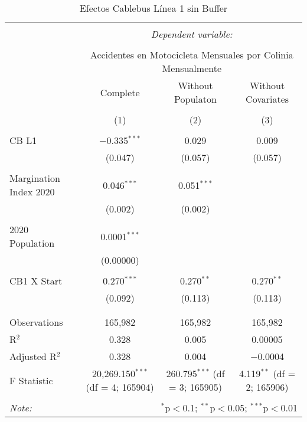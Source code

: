 
\begin{table}[!htbp] \centering 
  \caption{Efectos Cablebus Línea 1 sin Buffer} 
  \label{} 
\begin{tabular}{@{\extracolsep{5pt}}lccc} 
\\[-1.8ex]\hline 
\hline \\[-1.8ex] 
 & \multicolumn{3}{c}{\textit{Dependent variable:}} \\ 
\cline{2-4} 
\\[-1.8ex] & \multicolumn{3}{c}{Accidentes en Motocicleta Mensuales por Colinia Mensualmente} \\ 
 & Complete & Without Populaton & Without Covariates \\ 
\\[-1.8ex] & (1) & (2) & (3)\\ 
\hline \\[-1.8ex] 
 CB L1 & $-$0.335$^{***}$ & 0.029 & 0.009 \\ 
  & (0.047) & (0.057) & (0.057) \\ 
  & & & \\ 
 Margination Index 2020 & 0.046$^{***}$ & 0.051$^{***}$ &  \\ 
  & (0.002) & (0.002) &  \\ 
  & & & \\ 
 2020 Population & 0.0001$^{***}$ &  &  \\ 
  & (0.00000) &  &  \\ 
  & & & \\ 
 CB1 X Start & 0.270$^{***}$ & 0.270$^{**}$ & 0.270$^{**}$ \\ 
  & (0.092) & (0.113) & (0.113) \\ 
  & & & \\ 
\hline \\[-1.8ex] 
Observations & 165,982 & 165,982 & 165,982 \\ 
R$^{2}$ & 0.328 & 0.005 & 0.00005 \\ 
Adjusted R$^{2}$ & 0.328 & 0.004 & $-$0.0004 \\ 
F Statistic & 20,269.150$^{***}$ (df = 4; 165904) & 260.795$^{***}$ (df = 3; 165905) & 4.119$^{**}$ (df = 2; 165906) \\ 
\hline 
\hline \\[-1.8ex] 
\textit{Note:}  & \multicolumn{3}{r}{$^{*}$p$<$0.1; $^{**}$p$<$0.05; $^{***}$p$<$0.01} \\ 
\end{tabular} 
\end{table} 
